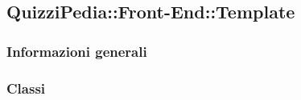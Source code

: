 \newpage

\subsection{QuizziPedia::Front-End::Template}
\subsubsection{Informazioni generali}
\subsubsection{Classi}

